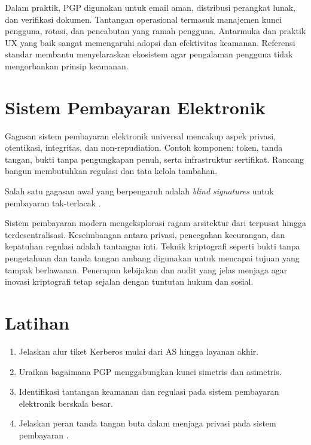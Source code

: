 \documentclass[../main.tex]{subfiles}
\begin{document}
Dalam praktik, PGP digunakan untuk email aman, distribusi perangkat lunak, dan verifikasi dokumen. Tantangan operasional termasuk manajemen kunci pengguna, rotasi, dan pencabutan yang ramah pengguna. Antarmuka dan praktik UX yang baik sangat memengaruhi adopsi dan efektivitas keamanan. Referensi standar membantu menyelaraskan ekosistem agar pengalaman pengguna tidak mengorbankan prinsip keamanan.

\section{Sistem Pembayaran Elektronik}
Gagasan sistem pembayaran elektronik universal mencakup aspek privasi, otentikasi, integritas, dan non-repudiation. Contoh komponen: token, tanda tangan, bukti tanpa pengungkapan penuh, serta infrastruktur sertifikat. Rancang bangun membutuhkan regulasi dan tata kelola tambahan.

Salah satu gagasan awal yang berpengaruh adalah \emph{blind signatures} untuk pembayaran tak-terlacak \citep{chaum_blind}.

Sistem pembayaran modern mengeksplorasi ragam arsitektur dari terpusat hingga terdesentralisasi. Keseimbangan antara privasi, pencegahan kecurangan, dan kepatuhan regulasi adalah tantangan inti. Teknik kriptografi seperti bukti tanpa pengetahuan dan tanda tangan ambang digunakan untuk mencapai tujuan yang tampak berlawanan. Penerapan kebijakan dan audit yang jelas menjaga agar inovasi kriptografi tetap sejalan dengan tuntutan hukum dan sosial.

\section{Latihan}
\begin{enumerate}
  \item Jelaskan alur tiket Kerberos mulai dari AS hingga layanan akhir.
  \item Uraikan bagaimana PGP menggabungkan kunci simetris dan asimetris.
  \item Identifikasi tantangan keamanan dan regulasi pada sistem pembayaran elektronik berskala besar.
  \item Jelaskan peran tanda tangan buta dalam menjaga privasi pada sistem pembayaran \citep{chaum_blind}.
\end{enumerate}
\end{document}
